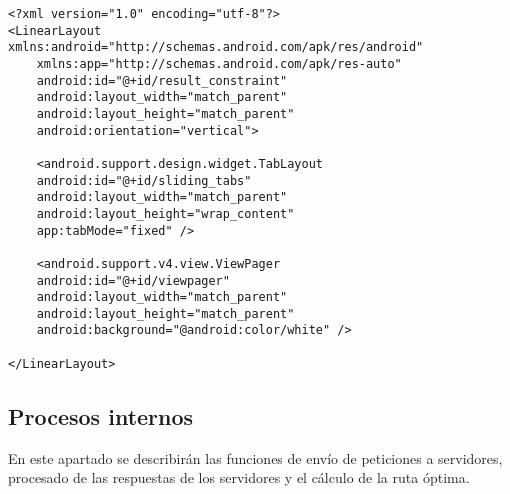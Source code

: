 \begin{lstlisting}[caption=Código XML de la vista con tabs]
<?xml version="1.0" encoding="utf-8"?>
<LinearLayout xmlns:android="http://schemas.android.com/apk/res/android"
	xmlns:app="http://schemas.android.com/apk/res-auto"
	android:id="@+id/result_constraint"
	android:layout_width="match_parent"
	android:layout_height="match_parent"
	android:orientation="vertical">

	<android.support.design.widget.TabLayout
	android:id="@+id/sliding_tabs"
	android:layout_width="match_parent"
	android:layout_height="wrap_content"
	app:tabMode="fixed" />
	
	<android.support.v4.view.ViewPager
	android:id="@+id/viewpager"
	android:layout_width="match_parent"
	android:layout_height="match_parent"
	android:background="@android:color/white" />

</LinearLayout>
\end{lstlisting}


\subsection[Procesos internos]{Procesos internos}
En este apartado se describirán las funciones de envío de peticiones a servidores, procesado de las respuestas de los servidores y el cálculo de la ruta óptima.
